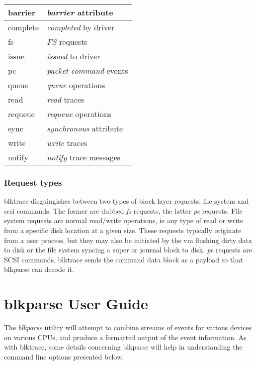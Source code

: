 \documentclass{article}
\begin{document}
\begin{tabular}{|l|l|}\hline
barrier & \emph{barrier} attribute \\ \hline
complete & \emph{completed} by driver \\ \hline
fs & \emph{FS} requests \\ \hline
issue & \emph{issued} to driver \\ \hline
pc & \emph{packet command} events \\ \hline
queue & \emph{queue} operations \\ \hline
read & \emph{read} traces \\ \hline
requeue & \emph{requeue} operations \\ \hline
sync & \emph{synchronous} attribute \\ \hline
write & \emph{write} traces \\ \hline
notify & \emph{notify} trace messages \\ \hline
\end{tabular}

\subsubsection{\label{sec:request-types}Request types}
blktrace disguingishes between two types of block layer requests,
file system and scsi commands. The former are dubbed \emph{fs}
requests, the latter \emph{pc} requests. File system requests are
normal read/write operations, ie any type of read or write from a
specific disk location at a given size. These requests typically
originate from a user process, but they may also be initiated by
the vm flushing dirty data to disk or the file system syncing
a super or journal block to disk. \emph{pc} requests are SCSI
commands. blktrace sends the command data block as a payload
so that blkparse can decode it.

\newpage\section{\label{sec:blkparse-ug}blkparse User Guide}

The \emph{blkparse} utility will attempt to combine streams of events
for various devices on various CPUs, and produce a formatted output of
the event information. As with blktrace, some details concerning blkparse
will help in understanding the command line options presented below.
\end{document}

